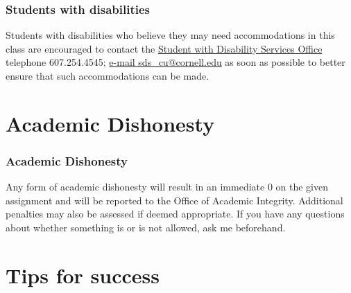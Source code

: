 \documentclass[11pt]{beamer}
\begin{document}

\begin{frame}
\frametitle{Students with disabilities}

Students with disabilities who believe they may need accommodations in this class are 
encouraged to contact the \alert{\href{https://www.sce.cornell.edu/sc/apply/disabilities.php}{Student with Disability 
Services Office}} telephone 607.254.4545; \url{e-mail sds_cu@cornell.edu} as soon as possible to better ensure that such 
accommodations can be made.


\end{frame}


\section{Academic Dishonesty}


\begin{frame}
\frametitle{Academic Dishonesty}

Any form of academic dishonesty will result in an immediate 0 on the given assignment 
and will be reported to the Office of Academic Integrity. Additional penalties may also 
be assessed if deemed appropriate. If you have any questions about whether something 
is or is not allowed, ask me beforehand.



\end{frame}



\section{Tips for success}

\end{document}
